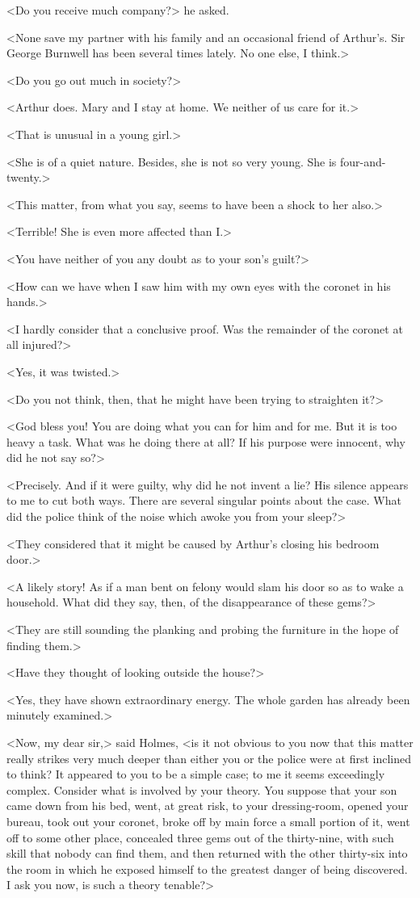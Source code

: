 <Do you receive much company?> he asked.

<None save my partner with his family and an occasional friend of Arthur's. Sir George Burnwell has been several times lately. No one else, I think.>

<Do you go out much in society?>

<Arthur does. Mary and I stay at home. We neither of us care for it.>

<That is unusual in a young girl.>

<She is of a quiet nature. Besides, she is not so very young. She is four-and-twenty.>

<This matter, from what you say, seems to have been a shock to her also.>

<Terrible! She is even more affected than I\@.>

<You have neither of you any doubt as to your son's guilt?>

<How can we have when I saw him with my own eyes with the coronet in his hands.>

<I hardly consider that a conclusive proof. Was the remainder of the coronet at all injured?>

<Yes, it was twisted.>

<Do you not think, then, that he might have been trying to straighten it?>

<God bless you! You are doing what you can for him and for me. But it is too heavy a task. What was he doing there at all? If his purpose were innocent, why did he not say so?>

<Precisely. And if it were guilty, why did he not invent a lie? His silence appears to me to cut both ways. There are several singular points about the case. What did the police think of the noise which awoke you from your sleep?>

<They considered that it might be caused by Arthur's closing his bedroom door.>

<A likely story! As if a man bent on felony would slam his door so as to wake a household. What did they say, then, of the disappearance of these gems?>

<They are still sounding the planking and probing the furniture in the hope of finding them.>

<Have they thought of looking outside the house?>

<Yes, they have shown extraordinary energy. The whole garden has already been minutely examined.>

<Now, my dear sir,> said Holmes, <is it not obvious to you now that this matter really strikes very much deeper than either you or the police were at first inclined to think? It appeared to you to be a simple case; to me it seems exceedingly complex. Consider what is involved by your theory. You suppose that your son came down from his bed, went, at great risk, to your dressing-room, opened your bureau, took out your coronet, broke off by main force a small portion of it, went off to some other place, concealed three gems out of the thirty-nine, with such skill that nobody can find them, and then returned with the other thirty-six into the room in which he exposed himself to the greatest danger of being discovered. I ask you now, is such a theory tenable?>

